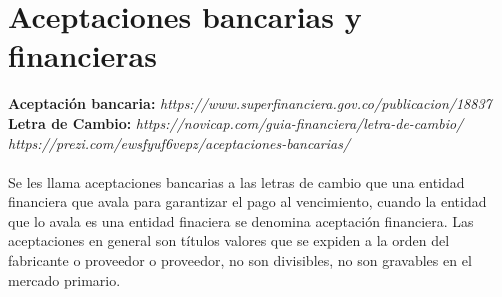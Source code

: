 
\section{Aceptaciones bancarias y financieras}
\textbf{Aceptación bancaria:} \textit{https://www.superfinanciera.gov.co/publicacion/18837}\\
\textbf{Letra de Cambio:}
\textit{https://novicap.com/guia-financiera/letra-de-cambio/}\\
$ $\hspace{100pt}\textit{https://prezi.com/ewsfyuf6vepz/aceptaciones-bancarias/}
\\
\\
Se les llama aceptaciones bancarias a las letras de cambio que una entidad financiera que avala para garantizar el pago al vencimiento, cuando la entidad que lo avala es una entidad finaciera se denomina aceptación financiera.
Las aceptaciones en general son títulos valores que se expiden a la orden del fabricante o proveedor o proveedor, no son divisibles, no son gravables en el mercado primario.\\















